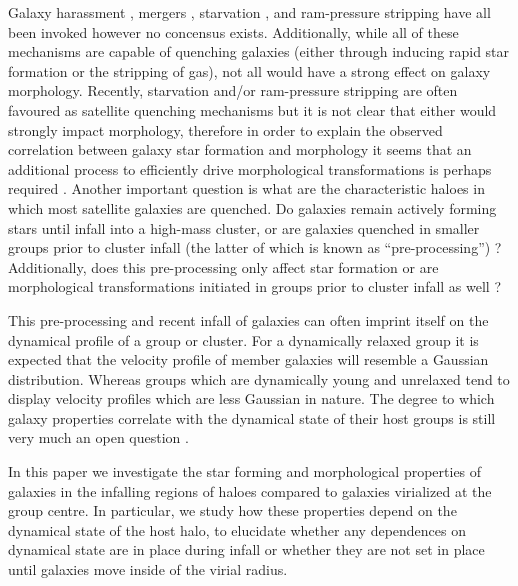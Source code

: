 \documentclass[a4paper,fleqn,usenatbib]{mnras}
\begin{document}
Galaxy harassment \citep[e.g.][]{moore1996}, mergers \citep[e.g.][]{mihos1994},
starvation \citep[e.g.][]{kawata2008}, and ram-pressure stripping
\citep[e.g.][]{gunn1972} have all been invoked however no concensus
exists.  Additionally, while all of these mechanisms are capable of
quenching galaxies (either through inducing rapid star formation or
the stripping of gas), not all would have a strong effect on galaxy
morphology.  Recently, starvation and/or ram-pressure stripping are
often favoured
as satellite quenching mechanisms \citep{muzzin2014, peng2015, fillingham2015,
  weisz2015, wetzel2015} but it is not clear that either
would strongly impact morphology, therefore in order to explain the
observed correlation between galaxy star formation and morphology it
seems that an additional process to efficiently drive morphological
transformations is perhaps required \citep[e.g.][]{christlein2004}.
Another important question is what are
the characteristic haloes in which most satellite galaxies are
quenched.  Do galaxies remain actively forming stars until infall into
a high-mass cluster, or are galaxies quenched in smaller groups prior
to cluster infall (the latter of which is known as
``pre-processing'') \citep{fujita2004, mcgee2009, cybulski2014,
  hou2014, haines2015, just2015}?  Additionally, does this pre-processing only
affect star formation or are morphological transformations initiated
in groups prior to cluster infall as well \citep{kodama2001, moran2007}? 
\par
This pre-processing and recent infall of galaxies can often imprint
itself on the dynamical profile of a group or cluster.  For a
dynamically relaxed group it is expected that the velocity profile of member
galaxies will resemble a Gaussian distribution.  Whereas groups which
are dynamically young and unrelaxed tend to display velocity
profiles which are less Gaussian in nature.  The degree to which
galaxy properties correlate with the dynamical state of their host
groups is still very much an open question \citep{biviano2002,
  ribeiro2010, hou2013, ribeiro2013, ribeiro2013b}.
\par
In this paper we investigate the star forming and
morphological properties of galaxies in the infalling regions of haloes
compared to
galaxies virialized at the group centre.  In particular, we study how
these properties depend on the dynamical state of the host halo, to
elucidate whether any dependences on dynamical state are in place during
infall or whether they are not set in place until galaxies move inside
of the virial radius.
\end{document}
